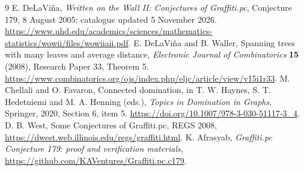\documentclass[11pt,a4paper]{article}
\begin{document}
\begin{thebibliography}{9}
 E. DeLaVi\~na, \emph{Written on the Wall II: Conjectures of Graffiti.pc}, Conjecture 179, 8 August 2005; catalogue updated 5 November 2026. \url{https://www.uhd.edu/academics/sciences/mathematics-statistics/wowii/files/wowiiaii.pdf}.
 E. DeLaVi\~na and B. Waller, Spanning trees with many leaves and average distance, \emph{Electronic Journal of Combinatorics} \textbf{15} (2008), Research Paper 33, Theorem 5. \url{https://www.combinatorics.org/ojs/index.php/eljc/article/view/v15i1r33}.
 M. Chellali and O. Favaron, Connected domination, in T. W. Haynes, S. T. Hedetniemi and M. A. Henning (eds.), \emph{Topics in Domination in Graphs}, Springer, 2020, Section 6, item 5. \url{https://doi.org/10.1007/978-3-030-51117-3_4}.
 D. B. West, Some Conjectures of Graffiti.pc, REGS 2008, \url{https://dwest.web.illinois.edu/regs/graffiti.html}.
 K. Afrasyab, \emph{Graffiti.pc Conjecture 179: proof and verification materials}, \url{https://github.com/KAVentures/Graffiti.pc.c179}.
\end{thebibliography}
\end{document}
